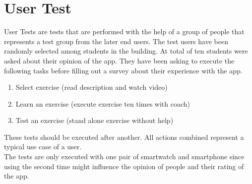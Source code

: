 \section{User Test}
User Tests are tests that are performed with the help of a group of people that represents a test group from the later end users. The test users have been randomly selected among students in the building. At total of ten students were asked about their opinion of the app. They have been asking to execute the following tasks before filling out a survey about their experience with the app.
\begin{enumerate}
\item Select exercise (read description and watch video)
\item Learn an exercise (execute exercise ten times with coach)
\item Test an exercise (stand alone exercise without help)
\end{enumerate}

These tests should be executed after another. All actions combined represent a typical use case of a user.\\
The tests are only executed with one pair of smartwatch and smartphone since using the second time might influence the opinion of people and their rating of the app.

